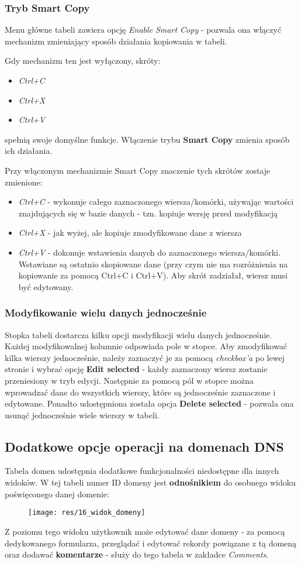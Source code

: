 \documentclass[12pt] {article}
\begin{document}
\subsubsection{Tryb Smart Copy}
Menu główne tabeli zawiera opcję \emph{Enable Smart Copy} - pozwala ona włączyć mechanizm zmieniający sposób działania kopiowania w tabeli. 

Gdy mechanizm ten jest wyłączony, skróty:
\begin{itemize}
\item \emph{Ctrl+C}
\item \emph{Ctrl+X}
\item \emph{Ctrl+V}
\end{itemize}
spełnią swoje domyślne funkcje. Włączenie trybu \textbf{Smart Copy} zmienia sposób ich działania.

Przy włączonym mechanizmie Smart Copy znaczenie tych skrótów zostaje zmienione:
\begin{itemize}
\item \emph{Ctrl+C} - wykonuje całego zaznaczonego wiersza/komórki, używając wartości znajdujących się w bazie danych - tzn. kopiuje wersję przed modyfikacją
\item \emph{Ctrl+X} - jak wyżej, ale kopiuje zmodyfikowane dane z wiersza
\item \emph{Ctrl+V} - dokonuje wstawienia danych do zaznaczonego wiersza/komórki. Wstawiane są ostatnio skopiowane dane (przy czym nie ma rozróżnienia na kopiowanie za pomocą Ctrl+C i Ctrl+V). Aby skrót zadziałał, wiersz musi być edytowany.
\end{itemize} 

\subsubsection{Modyfikowanie wielu danych jednocześnie}
Stopka tabeli dostarcza kilku opcji modyfikacji wielu danych jednocześnie. Każdej modyfikowalnej kolumnie odpowiada pole w stopce. Aby zmodyfikować kilka wierszy jednocześnie, należy zaznaczyć je za pomocą \emph{checkbox'a} po lewej stronie i wybrać opcję \textbf{Edit selected} - każdy zaznaczony wiersz zostanie przeniesiony w tryb edycji. Następnie za pomocą pól w stopce można wprowadzać dane do wszystkich wierszy, które są jednocześnie zaznaczone i edytowane. Ponadto udostępniona została opcja \textbf{Delete selected} - pozwala ona usunąć jednocześnie wiele wierszy w tabeli. 


\subsection{Dodatkowe opcje operacji na domenach DNS}
Tabela domen udostępnia dodatkowe funkcjonalności niedostępne dla innych widoków. W tej tabeli numer ID domeny jest \textbf{odnośnikiem} do osobnego widoku poświęconego danej domenie:
\begin{figure}[H]
\centering
\texttt{[image: res/16\_widok\_domeny]}
\end{figure}
Z poziomu tego widoku użytkownik może edytować dane domeny - za pomocą dedykowanego formularza, przeglądać i edytować rekordy powiązane z tą domeną oraz dodawać \textbf{komentarze} - służy do tego tabela w zakładce \emph{Comments}.
\end{document}
